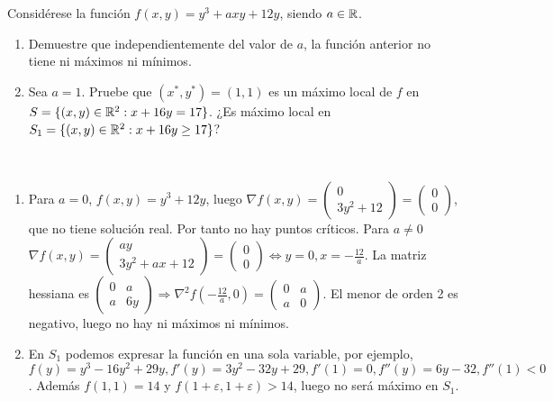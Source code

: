 \documentclass[twoside]{article}
\begin{document}
\begin{ejercicio}{10}
Considérese la función $f(x,y)=y^3+axy+12y$, siendo $a\in\mathbb{R}$.
\begin{enumerate}
\item Demuestre que independientemente del valor de $a$, la función anterior no tiene ni máximos ni mínimos.
\item Sea $a=1$. Pruebe que $(x^*,y^*)=(1,1)$ es un máximo local de $f$ en $S=\{(x,y)\in\mathbb{R}^2:x+16y=17\}$. ¿Es máximo local en $S_1=\{(x,y)\in\mathbb{R}^2:x+16y\geq 17\}$?
\end{enumerate}

\begin{solucion}\
\begin{enumerate}
\item Para $a=0$, $f(x,y)=y^3+12y$, luego $\nabla f(x,y)=\begin{pmatrix}
0\\
3y^2+12
\end{pmatrix}=\begin{pmatrix}
0\\
0
\end{pmatrix}$, que no tiene solución real. Por tanto no hay puntos críticos.
Para $a\neq 0$ $\nabla f(x,y)=\begin{pmatrix}
ay\\
3y^2+ax+12
\end{pmatrix}=\begin{pmatrix}
0\\
0
\end{pmatrix}\Leftrightarrow y=0,x=-\frac{12}{a}$. La matriz hessiana es $\begin{pmatrix}
0 & a\\
a & 6y
\end{pmatrix}\Rightarrow \nabla^2 f(-\frac{12}{a},0)=\begin{pmatrix}
0 & a\\
a & 0
\end{pmatrix}$. El menor de orden 2 es negativo, luego no hay ni máximos ni mínimos.
\item En $S_1$ podemos expresar la función en una sola variable, por ejemplo, $f(y)=y^3-16y^2+29y, f'(y)=3y^2-32y+29, f'(1)=0, f''(y)=6y-32,f''(1)<0$.
Además $f(1,1)=14$ y $f(1+\varepsilon,1+\varepsilon)>14$, luego no será máximo en $S_1$.
\end{enumerate}
\end{solucion}
\end{ejercicio}

\newpage 
\end{document}
